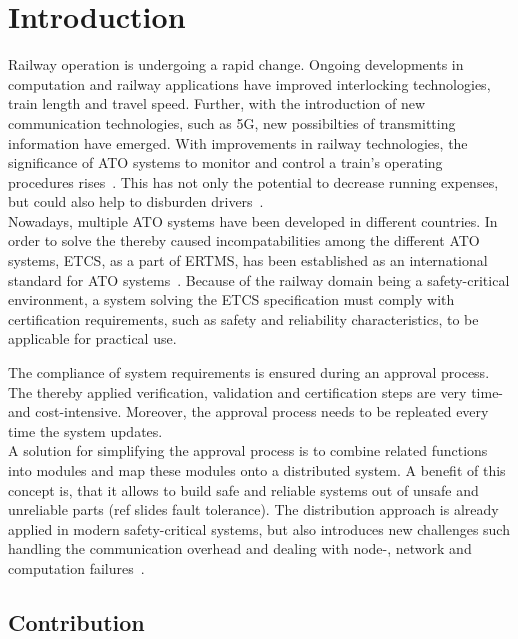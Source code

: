 \chapter{Introduction}
	
Railway operation is undergoing a rapid change.
Ongoing developments in computation and railway applications have improved interlocking technologies, train length and travel speed.
Further, with the introduction of new communication technologies, such as 5G, new possibilties of transmitting information have emerged.
With improvements in railway technologies, the significance of \gls*{ATO} systems to monitor and control a train's operating procedures rises~\cite{YIN2017RNDofATO}.
This has not only the potential to decrease running expenses, but could also help to disburden drivers~.
\\

Nowadays, multiple \gls*{ATO} systems have been developed in different countries.
In order to solve the thereby caused incompatabilities among the different \gls*{ATO} systems, \gls*{ETCS}, as a part of \gls*{ERTMS}, has been established as an international standard for \gls*{ATO} systems~\cite{ETCS26}.
Because of the railway domain being a safety-critical environment, a system solving the \gls*{ETCS} specification must comply with certification requirements, such as safety and reliability characteristics, to be applicable for practical use.

The compliance of system requirements is ensured during an approval process.
The thereby applied verification, validation and certification steps are very time- and cost-intensive.
Moreover, the approval process needs to be repleated every time the system updates.
\\

A solution for simplifying the approval process is to combine related functions into modules and map these modules onto a distributed system.
A benefit of this concept is, that it allows to build safe and reliable systems out of unsafe and unreliable parts (ref slides fault tolerance).
The distribution approach is already applied in modern safety-critical systems, but also introduces new challenges such handling the communication overhead and dealing with node-, network and computation failures~\cite{DistributedSafety2020}.

\section{Contribution}

